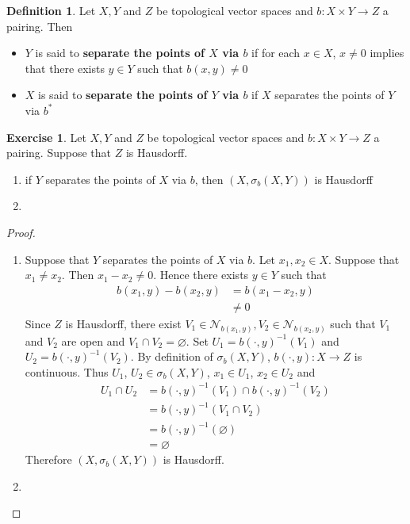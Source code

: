 \documentclass[12pt]{amsart}
\theoremstyle{definition}
\newtheorem{defn}[definition]{Definition}
\newtheorem{ex}[definition]{Exercise}
\newcommand{\sig}{\sigma}
\newcommand{\MN}{\mathcal{N}}
\newcommand{\tbf}[1]{\textbf{#1}}
\DeclareMathOperator*{\0}{\mbf{0}}
\DeclareMathOperator*{\1}{\mbf{1}}
\begin{document}
	\begin{defn}
		Let $X,Y$ and $Z$ be topological vector spaces and $b : X \times Y \rightarrow Z$ a pairing. Then 
		\begin{itemize}
			\item $Y$ is said to \tbf{separate the points of $X$ via $b$} if
			for each $x \in X$, $x \neq 0$ implies that there exists $y \in Y$ such that $b(x,y) \neq 0$
			\item $X$ is said to \tbf{separate the points of $Y$ via $b$} if $X$ separates the points of $Y$ via $b^*$
		\end{itemize}
	\end{defn}

	\begin{ex}
		Let $X,Y$ and $Z$ be topological vector spaces and $b : X \times Y \rightarrow Z$ a pairing. Suppose that $Z$ is Hausdorff.   
		\begin{enumerate}
			\item if $Y$ separates the points of $X$ via $b$, then $(X, \sig_b(X,Y))$ is Hausdorff
			\item 
		\end{enumerate}
	\end{ex}

	\begin{proof} \
		\begin{enumerate}
			\item Suppose that $Y$ separates the points of $X$ via $b$. Let $x_1, x_2 \in X$. Suppose that $x_1 \neq x_2$. Then $x_1 - x_2 \neq 0$. Hence there exists $y \in Y$ such that 
			\begin{align*}
				b(x_1, y) - b(x_2,y)
				& = b(x_1 - x_2,y) \\
				& \neq 0
			\end{align*}
			 Since $Z$ is Hausdorff, there exist $V_1 \in \MN_{b(x_1, y)}, V_2 \in \MN_{b(x_2, y)}$ such that $V_1$ and $V_2$ are open and $V_1 \cap V_2 = \varnothing$. Set $U_1 = b(\cdot, y)^{-1}(V_1)$ and $U_2 = b(\cdot, y)^{-1}(V_2)$. By definition of $\sig_b(X,Y)$, $b(\cdot, y): X \rightarrow Z$ is continuous. Thus $U_1$, $U_2 \in \sig_b(X,Y)$, $x_1 \in U_1$, $x_2 \in U_2$ and 
			 \begin{align*}
			 	U_1 \cap U_2
			 	& = b(\cdot, y)^{-1}(V_1) \cap b(\cdot, y)^{-1}(V_2) \\
			 	& = b(\cdot, y)^{-1}(V_1 \cap V_2) \\
			 	& = b(\cdot, y)^{-1}(\varnothing) \\
			 	& = \varnothing
			 \end{align*}
		 	Therefore $(X, \sig_b(X,Y))$ is Hausdorff. \\
			\item 
		\end{enumerate}
	\end{proof}
\end{document}

